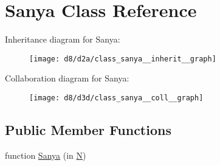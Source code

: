 \hypertarget{class_sanya}{}\section{Sanya Class Reference}
\label{class_sanya}


Inheritance diagram for Sanya\+:
\nopagebreak
\begin{figure}[H]
\begin{center}
\leavevmode
\texttt{[image: d8/d2a/class\_sanya\_\_inherit\_\_graph]}
\end{center}
\end{figure}


Collaboration diagram for Sanya\+:
\nopagebreak
\begin{figure}[H]
\begin{center}
\leavevmode
\texttt{[image: d8/d3d/class\_sanya\_\_coll\_\_graph]}
\end{center}
\end{figure}
\subsection*{Public Member Functions}
\begin{DoxyCompactItemize}
\item 
function \hyperlink{class_sanya_ae4dc5b888a77771a55a60a71ef175c2f}{Sanya} (in \hyperlink{class_sanya_a933e9e02d7cd73f9722669a5b9d5b1c5}{N})
\end{DoxyCompactItemize}
